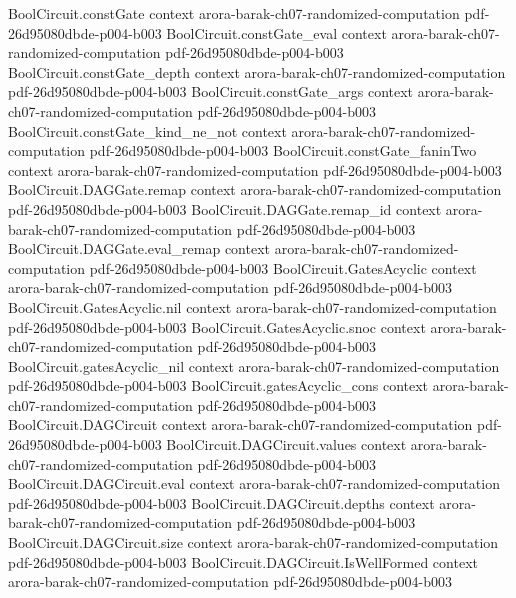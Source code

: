 \begin{theorem}
\proofstep
  {BoolCircuit.constGate}
  {context}
  {arora-barak-ch07-randomized-computation}
  {pdf-26d95080dbde-p004-b003}
\proofstep
  {BoolCircuit.constGate_eval}
  {context}
  {arora-barak-ch07-randomized-computation}
  {pdf-26d95080dbde-p004-b003}
\proofstep
  {BoolCircuit.constGate_depth}
  {context}
  {arora-barak-ch07-randomized-computation}
  {pdf-26d95080dbde-p004-b003}
\proofstep
  {BoolCircuit.constGate_args}
  {context}
  {arora-barak-ch07-randomized-computation}
  {pdf-26d95080dbde-p004-b003}
\proofstep
  {BoolCircuit.constGate_kind_ne_not}
  {context}
  {arora-barak-ch07-randomized-computation}
  {pdf-26d95080dbde-p004-b003}
\proofstep
  {BoolCircuit.constGate_faninTwo}
  {context}
  {arora-barak-ch07-randomized-computation}
  {pdf-26d95080dbde-p004-b003}
\proofstep
  {BoolCircuit.DAGGate.remap}
  {context}
  {arora-barak-ch07-randomized-computation}
  {pdf-26d95080dbde-p004-b003}
\proofstep
  {BoolCircuit.DAGGate.remap_id}
  {context}
  {arora-barak-ch07-randomized-computation}
  {pdf-26d95080dbde-p004-b003}
\proofstep
  {BoolCircuit.DAGGate.eval_remap}
  {context}
  {arora-barak-ch07-randomized-computation}
  {pdf-26d95080dbde-p004-b003}
\proofstep
  {BoolCircuit.GatesAcyclic}
  {context}
  {arora-barak-ch07-randomized-computation}
  {pdf-26d95080dbde-p004-b003}
\proofstep
  {BoolCircuit.GatesAcyclic.nil}
  {context}
  {arora-barak-ch07-randomized-computation}
  {pdf-26d95080dbde-p004-b003}
\proofstep
  {BoolCircuit.GatesAcyclic.snoc}
  {context}
  {arora-barak-ch07-randomized-computation}
  {pdf-26d95080dbde-p004-b003}
\proofstep
  {BoolCircuit.gatesAcyclic_nil}
  {context}
  {arora-barak-ch07-randomized-computation}
  {pdf-26d95080dbde-p004-b003}
\proofstep
  {BoolCircuit.gatesAcyclic_cons}
  {context}
  {arora-barak-ch07-randomized-computation}
  {pdf-26d95080dbde-p004-b003}
\proofstep
  {BoolCircuit.DAGCircuit}
  {context}
  {arora-barak-ch07-randomized-computation}
  {pdf-26d95080dbde-p004-b003}
\proofstep
  {BoolCircuit.DAGCircuit.values}
  {context}
  {arora-barak-ch07-randomized-computation}
  {pdf-26d95080dbde-p004-b003}
\proofstep
  {BoolCircuit.DAGCircuit.eval}
  {context}
  {arora-barak-ch07-randomized-computation}
  {pdf-26d95080dbde-p004-b003}
\proofstep
  {BoolCircuit.DAGCircuit.depths}
  {context}
  {arora-barak-ch07-randomized-computation}
  {pdf-26d95080dbde-p004-b003}
\proofstep
  {BoolCircuit.DAGCircuit.size}
  {context}
  {arora-barak-ch07-randomized-computation}
  {pdf-26d95080dbde-p004-b003}
\proofstep
  {BoolCircuit.DAGCircuit.IsWellFormed}
  {context}
  {arora-barak-ch07-randomized-computation}
  {pdf-26d95080dbde-p004-b003}

\end{theorem}
